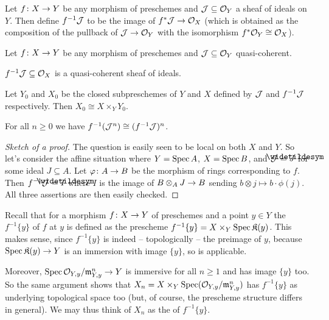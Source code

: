 \documentclass[a4paper,parskip=half,numbers=enddot, DIV=12]{scrreprt}
\renewcommand{\geq}{\geqslant}
\begin{document}
\begin{defi}
	Let $f\colon X\morphism Y$ be any morphism of preschemes and $\mathcal{J}\subseteq \mathcal{O}_Y$ a sheaf of ideals on $Y$. Then define $f^{-1}\mathcal{J}$ to be the image of $f^*\Jj\morphism\Oo_X$ (which is obtained as the composition of the pullback of $\Jj\morphism \Oo_Y$ with the isomorphism $f^*\mathcal{O}_Y\cong \mathcal{O}_X$).
\end{defi}
\begin{lem}
	Let $f\colon X\morphism Y$ be any morphism of preschemes and $\mathcal{J}\subseteq \mathcal{O}_Y$ quasi-coherent.
	\begin{alphanumerate}
		\item $f^{-1}\mathcal{J}\subseteq \mathcal{O}_X$ is a quasi-coherent sheaf of ideals.
		\item Let $Y_0$ and $X_0$ be the closed subpreschemes of $Y$ and $X$ defined by $\mathcal{J}$ and $f^{-1}\mathcal{J}$ respectively. Then $X_0\cong X\times_YY_0$.
		\item For all $n\geq 0$ we have $f^{-1}(\mathcal{J}^n)\cong (f^{-1}\mathcal{J})^n$.
	\end{alphanumerate}
\end{lem}
\begin{proof}[Sketch of a proof]
	The question is easily seen to be local on both $X$ and $Y$. So let's consider the affine situation where $Y=\operatorname{Spec} A$, $X=\operatorname{Spec} B$, and $\Jj=\snake{J}$ for some ideal $J\subseteq A$. Let $\phi\colon A\morphism B$ be the morphism of rings corresponding to $f$. Then $f^{-1}\Jj=\snake{I}$ where $I$ is the image of $B\otimes_AJ\morphism B$ sending $b\otimes j\mapsto b\cdot \phi(j)$. All three assertions are then easily checked.
\end{proof}
\begin{rem}
	\begin{alphanumerate}
		\item {}Recall that for a morphism $f\colon X\morphism Y$ of preschemes and a point $y\in Y$ the  $f^{-1}\{y\}$ of $f$ at $y$ is defined as the prescheme $f^{-1}\{y\}=X\times_Y\operatorname{Spec} \mathfrak{K}(y)$. This makes sense, since $f^{-1}\{y\}$ is indeed -- topologically -- the preimage of $y$, because $\Spec \KK(y)\morphism Y$ is an immersion with image $\{y\}$, so \cite[Corollary~1.3.3]{alggeo1} is applicable.
		\item Moreover, $\Spec \Oo_{Y,y}/\mm_{Y,y}^n\morphism Y$ is immersive for all $n\geq 1$ and has image $\{y\}$ too. So the same argument shows that $X_n=X\times_Y\operatorname{Spec} (\mathcal{O}_{Y,y}/\mathfrak{m}_{Y,y}^n)$ has $f^{-1}\{y\}$ as underlying topological space too (but, of course, the prescheme structure differs in general). We may thus think of $X_n$ as the  of $f^{-1}\{y\}$.
	\end{alphanumerate}
\end{rem}
\end{document}
